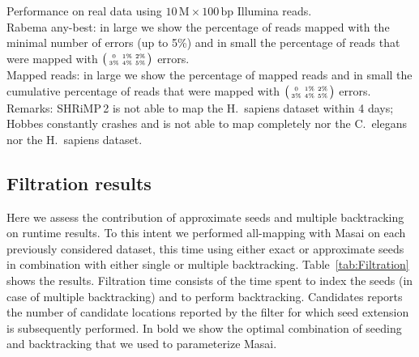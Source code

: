 \begin{table*}[t]
  \caption[Performance on real data]{
    \label{tab:Runtime}
    Performance on real data using $10\,\text{M}\times 100\,\text{bp}$ Illumina reads.\\
	Rabema any-best: in large we show the percentage of reads mapped with the minimal number of errors (up to 5\%) and in small the percentage of reads that were mapped with $\bigl(\begin{smallmatrix}\mbox{\tiny 0}&\mbox{\tiny 1\%}&\mbox{\tiny 2\%}\\\mbox{\tiny 3\%}&\mbox{\tiny 4\%}&\mbox{\tiny 5\%}\end{smallmatrix}\bigr)$ errors.\\
	Mapped reads: in large we show the percentage of mapped reads and in small the cumulative percentage of reads that were mapped with $\bigl(\begin{smallmatrix}\mbox{\tiny 0}&\mbox{\tiny 1\%}&\mbox{\tiny 2\%}\\\mbox{\tiny 3\%}&\mbox{\tiny 4\%}&\mbox{\tiny 5\%}\end{smallmatrix}\bigr)$ errors.\\
	Remarks:
    SHRiMP\,2 is not able to map the H.~sapiens dataset within 4 days;
    Hobbes constantly crashes and is not able to map completely nor the C.~elegans nor the H.~sapiens dataset.
  }
	\vspace{-3mm}
	\center
	\sffamily
	\resizebox{1.0\textwidth}{!}
	{
		\renewcommand{\tabcolsep}{0.8ex}
		
	}
\end{table*}


\subsection{Filtration results}

Here we assess the contribution of approximate seeds and multiple backtracking on runtime results.
To this intent we performed all-mapping with Masai on each previously considered dataset, this time using either exact or approximate seeds in combination with either single or multiple backtracking.
Table~\ref{tab:Filtration} shows the results.
Filtration time consists of the time spent to index the seeds (in case of multiple backtracking) and to perform backtracking.
Candidates reports the number of candidate locations reported by the filter for which seed extension is subsequently performed.
In bold we show the optimal combination of seeding and backtracking that we used to parameterize Masai.

